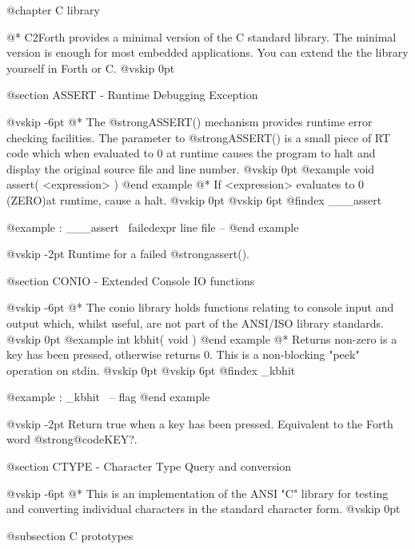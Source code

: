 
@chapter C library

@*
C2Forth provides a minimal version of the C standard library.
The minimal version is enough for most embedded applications.
You can extend the the library yourself in Forth or C.
@vskip 0pt

@section ASSERT - Runtime Debugging Exception


@vskip -6pt
@*
The @strong{ASSERT()} mechanism provides runtime error checking
facilities. The parameter to @strong{ASSERT()} is a small piece
of RT code which when evaluated to 0 at runtime causes the
program to halt and display the original source file and
line number.
@vskip 0pt
@example
void assert( <expression> ) @end example
@*
If <expression> evaluates to 0 (ZERO)at runtime, cause a halt.
@vskip 0pt
@vskip 6pt
@findex ___assert

@example
: ___assert     \ failedexpr line file -- @end example

@vskip -2pt
Runtime for a failed @strong{assert()}.

@section CONIO - Extended Console IO functions


@vskip -6pt
@*
The conio library holds functions relating to console input
and output which, whilst useful, are not part of the ANSI/ISO
library standards.
@vskip 0pt
@example
int kbhit( void ) @end example
@*
Returns non-zero is a key has been pressed, otherwise
returns 0. This is a non-blocking "peek" operation on
stdin.
@vskip 0pt
@vskip 6pt
@findex _kbhit

@example
: _kbhit        \ -- flag @end example

@vskip -2pt
Return true when a key has been pressed. Equivalent to the
Forth word @strong{@code{KEY?}}.

@section CTYPE - Character Type Query and conversion


@vskip -6pt
@*
This is an implementation of the ANSI "C" library for testing
and converting individual characters in the standard character
form.
@vskip 0pt

@subsection C prototypes


